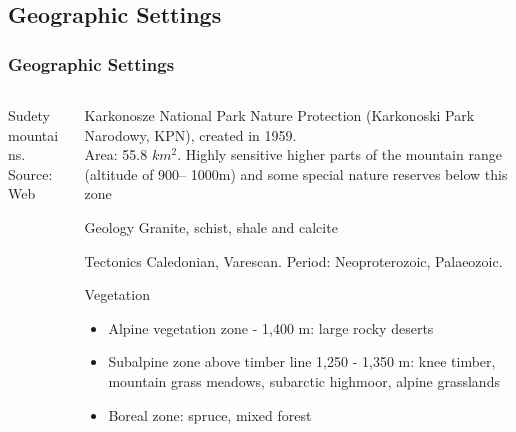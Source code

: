 \documentclass[pdflatex,compress,8pt,
	xcolor={dvipsnames,dvipsnames,svgnames,x11names,table},
	hyperref={colorlinks = true,
	breaklinks = true, urlcolor = NavyBlue, breaklinks = true}]{beamer}
\begin{document}
\subsection{Geographic Settings}
\begin{frame}\frametitle{Geographic Settings}
\begin{minipage}[0.4\textheight]{\textwidth}
\begin{columns}[T]
\begin{column}{0.3\textwidth}
\vspace{6em}
\begin{figure}[H]
	\centering
			\vspace{2mm}
\end{figure}
\small{Sudety mountains. \\Source: Web}
\end{column}
\begin{column}{0.7\textwidth}
\vspace{3em} 
\begin{alertblock}{Karkonosze National Park}
Nature Protection (Karkonoski Park Narodowy, KPN), created in 1959.\\
Area: 55.8 $km^{2}$. Highly sensitive higher parts of the mountain range (altitude of 900– 1000m) and some special nature reserves below this zone
\end{alertblock}

\begin{block}{Geology}
Granite, schist, shale and calcite
\end{block}

\begin{block}{Tectonics}
Caledonian, Varescan. Period: Neoproterozoic, Palaeozoic.
\end{block}

\begin{examples}{Vegetation}
\begin{itemize}
	\item Alpine vegetation zone - 1,400 m: large rocky deserts
	\item Subalpine zone above timber line 1,250 - 1,350 m: knee timber, mountain grass meadows, subarctic highmoor, alpine grasslands
	\item Boreal zone: spruce, mixed forest
\end{itemize}
\end{examples}
\end{column}
\end{columns}
\end{minipage}
\end{frame}
\end{document}
